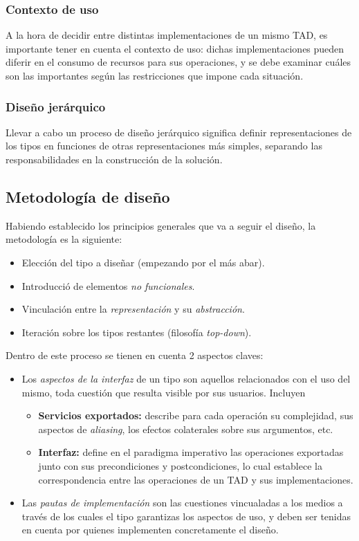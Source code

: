 \documentclass{article}
\begin{document}
\subsubsection{Contexto de uso}

A la hora de decidir entre distintas implementaciones de un mismo TAD, es importante tener en cuenta el contexto de uso: dichas implementaciones pueden diferir en el consumo de recursos para sus operaciones, y se debe examinar cuáles son las importantes según las restricciones que impone cada situación.

\subsubsection{Diseño jerárquico}

Llevar a cabo un proceso de diseño jerárquico significa definir representaciones de los tipos en funciones de otras representaciones más simples, separando las responsabilidades en la construcción de la solución.

\subsection{Metodología de diseño}

Habiendo establecido los principios generales que va a seguir el diseño, la metodología es la siguiente:
\begin{itemize}
    \item Elección del tipo a diseñar (empezando por el más abar).
    \item Introducció de elementos \textit{no funcionales}.
    \item Vinculación entre la \textit{representación} y su \textit{abstracción}.
    \item Iteración sobre los tipos restantes (filosofía \textit{top-down}).
\end{itemize}

Dentro de este proceso se tienen en cuenta 2 aspectos claves:
\begin{itemize}
    \item Los \textit{aspectos de la interfaz} de un tipo son aquellos relacionados con el uso del mismo, toda cuestión que resulta visible por sus usuarios. Incluyen
          \begin{itemize}
              \item \textbf{Servicios exportados:} describe para cada operación su complejidad, sus aspectos de \textit{aliasing}, los efectos colaterales sobre sus argumentos, etc.
              \item \textbf{Interfaz:} define en el paradigma imperativo las operaciones exportadas junto con sus precondiciones y postcondiciones, lo cual establece la correspondencia entre las operaciones de un TAD y sus implementaciones.
          \end{itemize}
    \item Las \textit{pautas de implementación} son las cuestiones vincualadas a los medios a través de los cuales el tipo garantizas los aspectos de uso, y deben ser tenidas en cuenta por quienes implementen concretamente el diseño.
\end{itemize}
\end{document}
